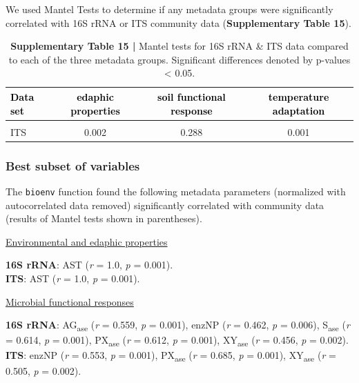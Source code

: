 \documentclass[
  10pt,
  letterpaper,
  DIV=11,
  numbers=noendperiod]{scrartcl}
\begin{document}
We used Mantel Tests to determine if any metadata groups were
significantly correlated with 16S rRNA or ITS community data
(\textbf{Supplementary Table 15}).

\begin{table}[H]

\caption{\textbf{Supplementary Table 15 |} Mantel tests for 16S rRNA \& ITS data compared to each of the three metadata groups. Significant differences denoted by p-values < 0.05.}
\centering
\fontsize{9}{11}\selectfont
\begin{tabular}[t]{lccc}
\toprule
\textcolor{black}{\textbf{Data set}} & \textcolor{black}{\textbf{edaphic properties}} & \textcolor{black}{\textbf{soil functional response}} & \textcolor{black}{\textbf{temperature adaptation}}\\
\midrule
\cellcolor{gray!6}{16S rRNA} & \cellcolor{gray!6}{0.003} & \cellcolor{gray!6}{0.180} & \cellcolor{gray!6}{0.001}\\
ITS & 0.002 & 0.288 & 0.001\\
\bottomrule
\end{tabular}
\end{table}

\hypertarget{best-subset-of-variables}{%
\subsubsection{Best subset of
variables}\label{best-subset-of-variables}}

The \texttt{bioenv} function found the following metadata parameters
(normalized with autocorrelated data removed) significantly correlated
with community data (results of Mantel tests shown in parentheses).

\underline{Environmental and edaphic properties}

\textbf{16S rRNA}: AST (\emph{r} = 1.0, \emph{p} = 0.001).\\
\textbf{ITS}: AST (\emph{r} = 1.0, \emph{p} = 0.001).

\underline{Microbial functional responses}

\textbf{16S rRNA}: AG\textsubscript{ase} (\emph{r} = 0.559, \emph{p} =
0.001), enzNP (\emph{r} = 0.462, \emph{p} = 0.006), S\textsubscript{ase}
(\emph{r} = 0.614, \emph{p} = 0.001), PX\textsubscript{ase} (\emph{r} =
0.612, \emph{p} = 0.001), XY\textsubscript{ase} (\emph{r} = 0.456,
\emph{p} = 0.002).\\
\textbf{ITS}: enzNP (\emph{r} = 0.553, \emph{p} = 0.001),
PX\textsubscript{ase} (\emph{r} = 0.685, \emph{p} = 0.001),
XY\textsubscript{ase} (\emph{r} = 0.505, \emph{p} = 0.002).
\end{document}

